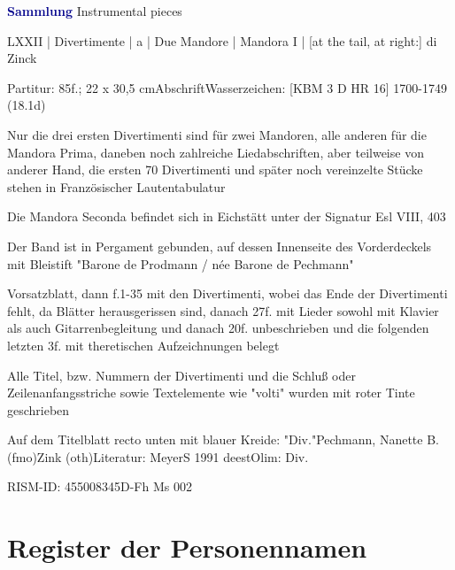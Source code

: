 \documentclass[twocolumn, 12pt]{book}
\begin{document}
\par \vspace{16pt} \textcolor{darkblue}{\textbf{Sammlung}} Instrumental pieces
\par \begin{itshape} LXXII | Divertimente | a | Due Mandore | Mandora I | [at the tail, at right:] di Zinck\end{itshape} 
\par \textcolor{darkblue}{}  Partitur: 85f.; 22 x 30,5 cm\newline Abschrift\newline Wasserzeichen: [KBM 3 D HR 16]  1700-1749 (18.1d)
\par Nur die drei ersten Divertimenti sind für zwei Mandoren, alle anderen für die Mandora Prima, daneben noch zahlreiche Liedabschriften, aber teilweise von anderer Hand, die ersten 70 Divertimenti und später noch vereinzelte Stücke stehen in Französischer Lautentabulatur
\par Die Mandora Seconda befindet sich in Eichstätt unter der Signatur Esl VIII, 403
\par Der Band ist in Pergament gebunden, auf dessen Innenseite des Vorderdeckels mit Bleistift "Barone de Prodmann / née Barone de Pechmann"
\par Vorsatzblatt, dann f.1-35 mit den Divertimenti, wobei das Ende der Divertimenti fehlt, da Blätter herausgerissen sind, danach 27f. mit Lieder sowohl mit Klavier als auch Gitarrenbegleitung und danach 20f. unbeschrieben und die folgenden letzten 3f. mit theretischen Aufzeichnungen belegt
\par Alle Titel, bzw. Nummern der Divertimenti und die Schluß oder Zeilenanfangsstriche sowie Textelemente wie "volti" wurden mit roter Tinte geschrieben
\par Auf dem Titelblatt recto unten mit blauer Kreide: "Div."\newline Pechmann, Nanette B.  (fmo)\newline Zink  (oth)\newline Literatur: MeyerS 1991  deest\newline Olim: Div.
\par RISM-ID: 455008345\newline D-Fh  Ms 002
    \clearpage  
\chapter*{\centering Register der Personennamen}
\fancyhead{}
\end{document}
